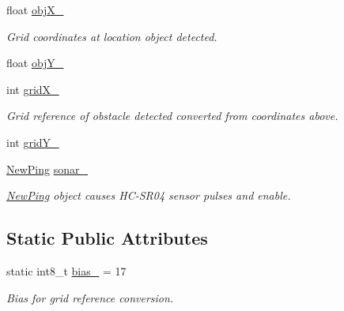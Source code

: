\begin{DoxyCompactItemize}
\item 
float \mbox{\hyperlink{class_obstacle_sensor_a7ef55ced2aa190347a8a4fda017eec5c}{obj\+X\+\_\+}}
\begin{DoxyCompactList}\small\item\em Grid coordinates at location object detected. \end{DoxyCompactList}\item 
float \mbox{\hyperlink{class_obstacle_sensor_a8df25c3d11ae7b8e652bc8bb56fd6f64}{obj\+Y\+\_\+}}
\item 
int \mbox{\hyperlink{class_obstacle_sensor_a860064c48fae2c973d7e9b59868faff6}{grid\+X\+\_\+}}
\begin{DoxyCompactList}\small\item\em Grid reference of obstacle detected converted from coordinates above. \end{DoxyCompactList}\item 
int \mbox{\hyperlink{class_obstacle_sensor_a31c6b57b181045cf59227db2720da6f4}{grid\+Y\+\_\+}}
\item 
\mbox{\hyperlink{class_new_ping}{New\+Ping}} \mbox{\hyperlink{class_obstacle_sensor_a761a011e9009edaaee103d9bafceba14}{sonar\+\_\+}}
\begin{DoxyCompactList}\small\item\em \mbox{\hyperlink{class_new_ping}{New\+Ping}} object causes H\+C-\/\+S\+R04 sensor pulses and enable. \end{DoxyCompactList}\end{DoxyCompactItemize}
\subsection*{Static Public Attributes}
\begin{DoxyCompactItemize}
\item 
static int8\+\_\+t \mbox{\hyperlink{class_obstacle_sensor_a7d083be5c0be76782c37d8d41fc636e5}{bias\+\_\+}} = 17
\begin{DoxyCompactList}\small\item\em Bias for grid reference conversion. \end{DoxyCompactList}\end{DoxyCompactItemize}

